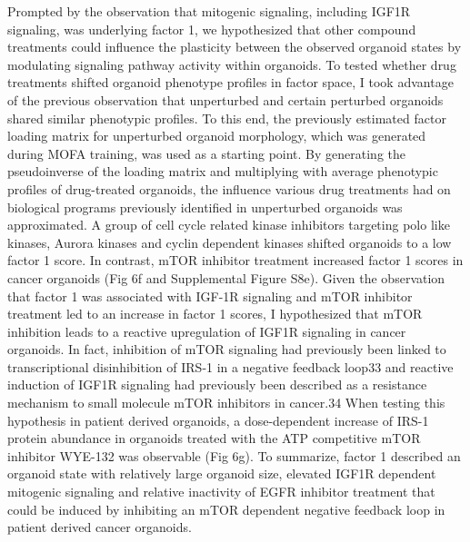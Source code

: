 \begin{flushleft}
Prompted by the observation that mitogenic signaling, including IGF1R signaling, was underlying factor 1, we hypothesized that other compound treatments could influence the plasticity between the observed organoid states by modulating signaling pathway activity within organoids. To tested whether drug treatments shifted organoid phenotype profiles in factor space, I took advantage of the previous observation that unperturbed and certain perturbed organoids shared similar phenotypic profiles. To this end, the previously estimated factor loading matrix for unperturbed organoid morphology, which was generated during MOFA training, was used as a starting point. By generating the pseudoinverse of the loading matrix and multiplying with average phenotypic profiles of drug-treated organoids, the influence various drug treatments had on biological programs previously identified in unperturbed organoids was approximated. A group of cell cycle related kinase inhibitors targeting polo like kinases, Aurora kinases and cyclin dependent kinases shifted organoids to a low factor 1 score. In contrast, mTOR inhibitor treatment increased factor 1 scores in cancer organoids (Fig 6f and Supplemental Figure S8e). Given the observation that factor 1 was associated with IGF-1R signaling and mTOR inhibitor treatment led to an increase in factor 1 scores, I hypothesized that mTOR inhibition leads to a reactive upregulation of IGF1R signaling in cancer organoids. In fact, inhibition of mTOR signaling had previously been linked to transcriptional disinhibition of IRS-1 in a negative feedback loop33 and  reactive induction of IGF1R signaling had previously been described as a resistance mechanism to small molecule mTOR inhibitors in cancer.34 When testing this hypothesis in patient derived organoids, a dose-dependent increase of IRS-1 protein abundance in organoids treated with the ATP competitive mTOR inhibitor WYE-132 was observable (Fig 6g). To summarize, factor 1 described an organoid state with relatively large organoid size, elevated IGF1R dependent mitogenic signaling and relative inactivity of EGFR inhibitor treatment that could be induced by inhibiting an mTOR dependent negative feedback loop in patient derived cancer organoids.


\end{flushleft}
